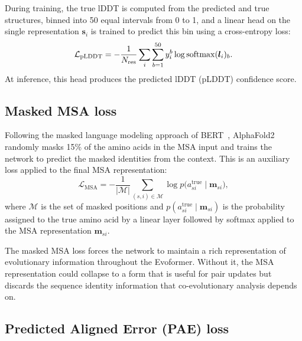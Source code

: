 During training, the true lDDT is computed from the predicted and true structures, binned into 50 equal intervals from 0 to 1, and a linear head on the single representation $\bm{s}_i$ is trained to predict this bin using a cross-entropy loss:
\begin{equation}
\label{eq:plddt-loss}
\mathcal{L}_\text{pLDDT} = -\frac{1}{N_\text{res}} \sum_i \sum_{b=1}^{50} y_i^b \log \operatorname{softmax}(\bm{l}_i)_b.
\end{equation}
At inference, this head produces the predicted lDDT (pLDDT) confidence score.

\subsection*{Masked MSA loss}
\label{sec:af2-masked-msa}

Following the masked language modeling approach of BERT~\cite{devlin2019}, AlphaFold2 randomly masks 15\% of the amino acids in the MSA input and trains the network to predict the masked identities from the context.
This is an auxiliary loss applied to the final MSA representation:
\begin{equation}
\label{eq:masked-msa-loss}
\mathcal{L}_\text{MSA} = -\frac{1}{|\mathcal{M}|} \sum_{(s,i) \in \mathcal{M}} \log p\bigl(a_{si}^\text{true} \mid \bm{m}_{si}\bigr),
\end{equation}
where $\mathcal{M}$ is the set of masked positions and $p(a_{si}^\text{true} \mid \bm{m}_{si})$ is the probability assigned to the true amino acid by a linear layer followed by softmax applied to the MSA representation $\bm{m}_{si}$.

The masked MSA loss forces the network to maintain a rich representation of evolutionary information throughout the Evoformer.
Without it, the MSA representation could collapse to a form that is useful for pair updates but discards the sequence identity information that co-evolutionary analysis depends on.

\subsection*{Predicted Aligned Error (PAE) loss}
\label{sec:af2-pae-loss}

